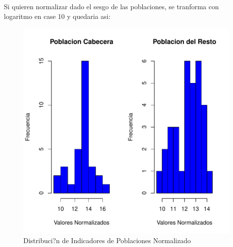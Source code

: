 Si quieren normalizar dado el sesgo de las poblaciones, se tranforma con logaritmo en case 10 y quedaria asi:

\begin{figure}[h]
\centering
\includegraphics{univariada-hist1}
\caption{Distribuci?n de Indicadores de Poblaciones Normalizado}
\label{hist1}
\end{figure}

\endinput
